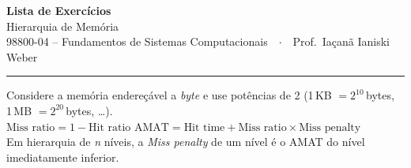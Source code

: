 \documentclass[10pt, a4paper]{article}
\begin{document}
\begin{center}
  {\Large \textbf{Lista de Exerc\'{i}cios}}\\[2pt]
  {\large Hierarquia de Mem\'{o}ria}\\[3pt]
  {\normalsize 98800-04 -- Fundamentos de Sistemas Computacionais\ \ $\cdot$\ \ Prof.\ Ia\c{c}an\~{a} Ianiski Weber}
\end{center}

\vspace{1pt}
\hrule
\vspace{4pt}

\begin{formulario}
\small
Considere a mem\'{o}ria endere\c{c}\'{a}vel a \emph{byte} e use pot\^{e}ncias de 2 (1\,KB $=2^{10}$\,bytes, 1\,MB $=2^{20}$\,bytes, \ldots).\\[2pt]
$\text{Miss ratio} = 1 - \text{Hit ratio}$ \qquad
$\text{AMAT} = \text{Hit time} + \text{Miss ratio} \times \text{Miss penalty}$\\[2pt]
Em hierarquia de \emph{n} n\'{i}veis, a \emph{Miss penalty} de um n\'{i}vel \'{e} o AMAT do n\'{i}vel imediatamente inferior.
\end{formulario}
\end{document}
